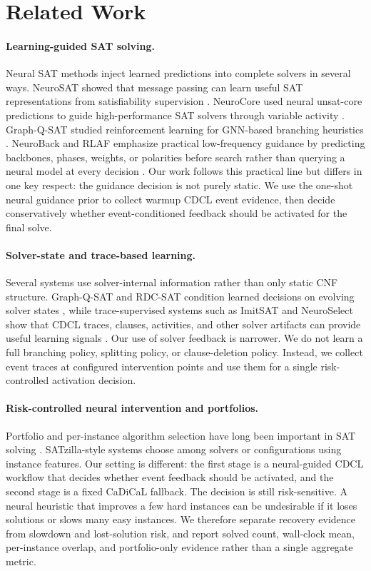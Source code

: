 \documentclass[11pt]{article}
\begin{document}
\section{Related Work}

\paragraph{Learning-guided SAT solving.}
Neural SAT methods inject learned predictions into complete solvers in several ways. NeuroSAT showed that message passing can learn useful SAT representations from satisfiability supervision \cite{neurosat}. NeuroCore used neural unsat-core predictions to guide high-performance SAT solvers through variable activity \cite{neurocore}. Graph-Q-SAT studied reinforcement learning for GNN-based branching heuristics \cite{graphqsat}. NeuroBack and RLAF emphasize practical low-frequency guidance by predicting backbones, phases, weights, or polarities before search rather than querying a neural model at every decision \cite{neuroback,rlaf}. Our work follows this practical line but differs in one key respect: the guidance decision is not purely static. We use the one-shot neural guidance prior to collect warmup CDCL event evidence, then decide conservatively whether event-conditioned feedback should be activated for the final solve.

\paragraph{Solver-state and trace-based learning.}
Several systems use solver-internal information rather than only static CNF structure. Graph-Q-SAT and RDC-SAT condition learned decisions on evolving solver states \cite{graphqsat,rdcsat}, while trace-supervised systems such as ImitSAT and NeuroSelect show that CDCL traces, clauses, activities, and other solver artifacts can provide useful learning signals \cite{imitsat,neuroselect}. Our use of solver feedback is narrower. We do not learn a full branching policy, splitting policy, or clause-deletion policy. Instead, we collect event traces at configured intervention points and use them for a single risk-controlled activation decision.

\paragraph{Risk-controlled neural intervention and portfolios.}
Portfolio and per-instance algorithm selection have long been important in SAT solving \cite{satzilla,kotthoff}. SATzilla-style systems choose among solvers or configurations using instance features. Our setting is different: the first stage is a neural-guided CDCL workflow that decides whether event feedback should be activated, and the second stage is a fixed CaDiCaL fallback. The decision is still risk-sensitive. A neural heuristic that improves a few hard instances can be undesirable if it loses solutions or slows many easy instances. We therefore separate recovery evidence from slowdown and lost-solution risk, and report solved count, wall-clock mean, per-instance overlap, and portfolio-only evidence rather than a single aggregate metric.
\end{document}
